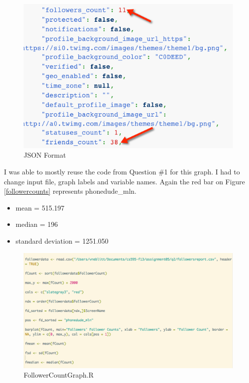 \documentclass{article}
\begin{document}
\begin{figure}[H]
\centering
\includegraphics[scale=0.50]{q2/jsonformat}
\caption{JSON Format}
\label{jsonformat}
\end{figure}

I was able to mostly reuse the code from Question \#1 for this graph. I had to change input file, graph labels and variable names. Again the red bar on Figure \ref{followercounts} represents phonedude\_mln.

\begin{itemize}
\item mean = 515.197
\item median = 196
\item standard deviation = 1251.050
\end{itemize}

\begin{figure}[H]
\centering
\includegraphics[scale=0.40]{q2/rscriptTfollowers}
\caption{FollowerCountGraph.R}
\label{followercountgraph}
\end{figure}
\end{document}
